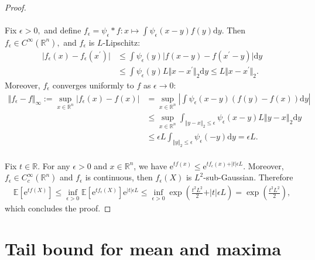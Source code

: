 \documentclass{article}
\newcommand{\E}{\mathbb{E}}
\begin{document}
\begin{proof}
\paragraph{} Fix $\epsilon > 0,$ and define $f_\epsilon = \psi_\epsilon * f:x\mapsto\int\psi_\epsilon(x-y)f(y)\mathrm{d}y.$ Then $f_\epsilon\in C^\infty(\mathbb{R}^n),$ and $f_\epsilon$ is $L$-Lipschitz:
\begin{align*}
	\vert f_\epsilon(x) - f_\epsilon(x^\prime)\vert &\leq \int\psi_\epsilon(y)\bigl\vert f(x-y) - f(x^\prime - y)\bigr\vert\mathrm{d}y\\
	&\leq \int\psi_\epsilon(y)L\Vert x-x^\prime\Vert_2\mathrm{d}y\leq L\Vert x-x^\prime\Vert_2.\tag{2.13}
\end{align*}
Moreover, $f_\epsilon$ converges uniformly to $f$ as $\epsilon\to 0$:
\begin{align*}
	\Vert f_\epsilon - f\Vert_\infty := \sup_{x\in\mathbb{R}^n}\vert f_\epsilon(x) - f(x)\vert &= \sup_{x\in\mathbb{R}^n}\left\vert\int\psi_\epsilon(x-y)\left(f(y) - f(x)\right)\mathrm{d}y\right\vert\\
	&\leq \sup_{x\in\mathbb{R}^n}\int_{\Vert y-x\Vert_2\leq\epsilon}\psi_\epsilon(x-y) L\left\Vert y-x\right\Vert_2\mathrm{d}y\\
	&\leq \epsilon L\int_{\Vert y\Vert_2\leq\epsilon}\psi_\epsilon(-y) \mathrm{d}y = \epsilon L.\tag{2.14}
\end{align*}

\paragraph{} Fix $t\in\mathbb{R}.$ For any $\epsilon > 0$ and $x\in\mathbb{R}^n$, we have $\mathrm{e}^{tf(x)}\leq\mathrm{e}^{tf_\epsilon(x) + \vert t\vert\epsilon L}.$ Moreover, $f_\epsilon\in C_c^\infty(\mathbb{R}^n)$ and $f_\epsilon$ is continuous, then $f_\epsilon(X)$ is $L^2$-sub-Gaussian. Therefore
\begin{align*}
	\E\left[\mathrm{e}^{tf(X)}\right] \leq \inf_{\epsilon > 0}\E\left[\mathrm{e}^{tf_\epsilon(X)}\right]\mathrm{e}^{\vert t\vert\epsilon L}\leq\inf_{\epsilon > 0}\exp\left(\frac{t^2L^2}{2} + \vert t\vert\epsilon L\right) = \exp\left(\frac{t^2L^2}{2}\right),\tag{2.15}
\end{align*}
which concludes the proof.
\end{proof}

\section{Tail bound for mean and maxima}
\end{document}
